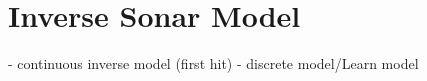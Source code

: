 \section{Inverse Sonar Model}
\citet{Moravec1985} - continuous inverse model (first hit)
\citet{thrunprob} - discrete model/Learn model